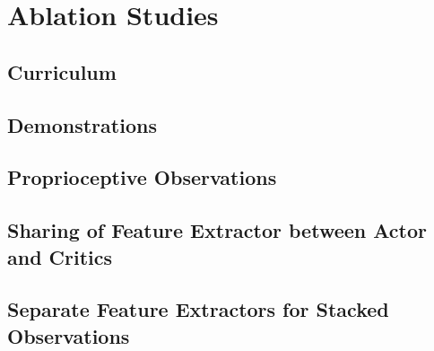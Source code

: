\section{Ablation Studies}

\subsection{Curriculum}

\subsection{Demonstrations}

\subsection{Proprioceptive Observations}

\subsection{Sharing of Feature Extractor between Actor and Critics}

\subsection{Separate Feature Extractors for Stacked Observations}

